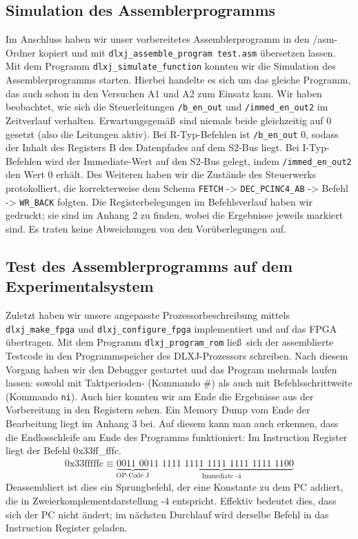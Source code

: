 \documentclass[12pt,a4paper]{scrartcl}
\begin{document}
\subsection*{Simulation des Assemblerprogramms}
Im Anschluss haben wir unser vorbereitetes Assemblerprogramm in den /asm-Ordner kopiert und mit \texttt{dlxj\_assemble\_program test.asm} \"ubersetzen lassen.
Mit dem Programm \texttt{dlxj\_simulate\_function} konnten wir die Simulation des Assemblerprogramms starten.
Hierbei handelte es sich um das gleiche Programm, das auch schon in den Versuchen A1 und A2 zum Einsatz kam.
Wir haben beobachtet, wie sich die Steuerleitungen \texttt{/b\_en\_out} und \texttt{/immed\_en\_out2} im Zeitverlauf verhalten.
Erwartungsgem\"a\ss\  sind niemals beide gleichzeitig auf 0 gesetzt (also die Leitungen aktiv).
Bei R-Typ-Befehlen ist \texttt{/b\_en\_out} 0, sodass der Inhalt des Registers B des Datenpfades auf dem S2-Bus liegt.
Bei I-Typ-Befehlen wird der Immediate-Wert auf den S2-Bus gelegt, indem \texttt{/immed\_en\_out2} den Wert 0 erh\"alt.
Des Weiteren haben wir die Zust\"ande des Steuerwerks protokolliert, die korrekterweise dem Schema \texttt{FETCH} -> \texttt{DEC\_PCINC4\_AB} -> Befehl -> \texttt{WR\_BACK} folgten.
Die Registerbelegungen im Befehlsverlauf haben wir gedruckt; sie sind im Anhang 2 zu finden, wobei die Ergebnisse jeweils markiert sind.
Es traten keine Abweichungen von den Vor\"uberlegungen auf.

\subsection*{Test des Assemblerprogramms auf dem Experimentalsystem}
Zuletzt haben wir unsere angepasste Prozessorbeschreibung mittels \texttt{dlxj\_make\_fpga} und \texttt{dlxj\_configure\_fpga} implementiert und auf das FPGA \"ubertragen.
Mit dem Programm \texttt{dlxj\_program\_rom} lie\ss\  sich der assemblierte Testcode in den Programmspeicher des DLXJ-Prozessors schreiben.
Nach diesem Vorgang haben wir den Debugger gestartet und das Program mehrmals laufen lassen: sowohl mit Taktperioden- (Kommando \#) als auch mit Befehlsschrittweite (Kommando \texttt{ni}).
Auch hier konnten wir am Ende die Ergebnisse aus der Vorbereitung in den Registern sehen.
Ein Memory Dump vom Ende der Bearbeitung liegt im Anhang 3 bei.
Auf diesem kann man auch erkennen, dass die Endlosschleife am Ende des Programms funktioniert:
Im Instruction Register liegt der Befehl 0x33ff\_fffc.
\begin{align*}
\text{0x33fffffc} \equiv \underbrace{\text{0011 00}}_{\text{OP-Code J}}\underbrace{\text{11 1111 1111 1111 1111 1111 1100}}_{\text{Immediate -4}}
\end{align*}
Deassembliert ist dies ein Sprungbefehl, der eine Konstante zu dem PC addiert, die in Zweierkomplementdarstellung -4 entspricht.
Effektiv bedeutet dies, dass sich der PC nicht \"andert; im n\"achsten Durchlauf wird derselbe Befehl in das Instruction Register geladen.
\end{document}
